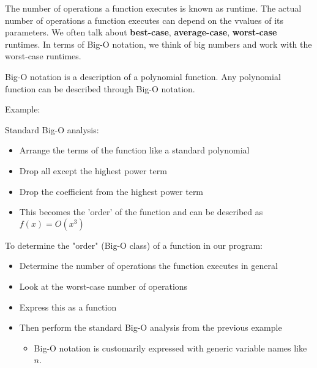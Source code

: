 \documentclass[11pt,a4paper,english]{paper}
\begin{document}
\bigskip

\noindent The number of operations a function executes is known as runtime. The actual number of operations a function executes can depend on the vvalues of its parameters. We often talk about \textbf{best-case}, \textbf{average-case}, \textbf{worst-case} runtimes. In terms of Big-O notation, we think of big numbers and work with the worst-case runtimes.

\bigskip
\noindent Big-O notation is a description of a polynomial function. Any polynomial function can be described through Big-O notation.

\bigskip

\begin{bluebox}{Example:} {

    Standard Big-O analysis:

    \begin{itemize}

      \item Arrange the terms of the function like a standard polynomial
      \item Drop all except the highest power term
      \item Drop the coefficient from the highest power term
      \item This becomes the 'order' of the function and can be described as $f(x) = O(x^3)$


    \end{itemize}


\bigskip
} \end{bluebox}
\bigskip


  \noindent To determine the "order" (Big-O class) of a function in our program:

  \begin{itemize}

  \item Determine the number of operations the function executes in general
  \item Look at the worst-case number of operations
  \item Express this as a function
  \item Then perform the standard Big-O analysis from the previous example
    \begin{itemize}
      \item Big-O notation is customarily expressed with generic variable names like $n$.
      \end{itemize}



  \end{itemize}
\end{document}
